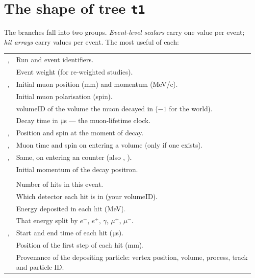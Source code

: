 \section{The shape of tree \texttt{t1}}
The branches fall into two groups. \emph{Event-level scalars} carry one value per event; \emph{hit arrays} carry  values per event. The most useful of each:

{\tablestyle
\begin{tabularx}{\textwidth}{@{}>{\raggedright\arraybackslash}p{} L@{}}
\toprule
{}\\
\midrule
{},  & Run and event identifiers.\\
 & Event weight (for re-weighted studies).\\
,  & Initial muon position (mm) and momentum (MeV/c).\\
 & Initial muon polarisation (spin).\\
 & volumeID of the volume the muon decayed in (\(-1\) for the world).\\
 & Decay time in \si{\micro s} --- the muon-lifetime clock.\\
,  & Position and spin at the moment of decay.\\
,  & Muon time and spin on entering a  volume (only if one exists).\\
,  & Same, on entering an  counter (also , ).\\
 & Initial momentum of the decay positron.\\
\midrule
{}\\
\midrule
{} & Number of hits in this event.\\
 & Which detector each hit is in (your volumeID).\\
 & Energy deposited in each hit (MeV).\\
 & That energy split by \(e^-\), \(e^+\), \(\gamma\), \(\mu^+\), \(\mu^-\).\\
,  & Start and end time of each hit (\si{\micro s}).\\
 & Position of the first step of each hit (mm).\\
 & Provenance of the depositing particle: vertex position, volume, process, track and particle ID.\\
\bottomrule
\end{tabularx}}

